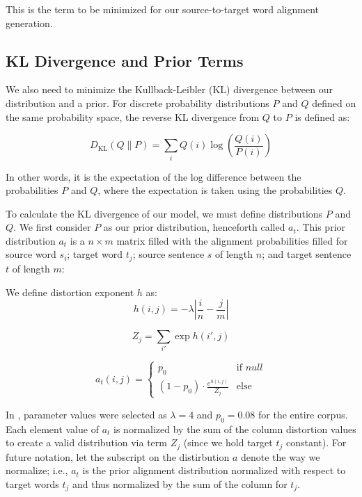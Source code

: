 \documentclass[twoside,twocolumn]{article}
\newlength\mystoreparindent
\newenvironment{myparindent}[1]{%
  \setlength{\mystoreparindent}{\the\parindent}
  \setlength{\parindent}{#1}
  }{%
  \setlength{\parindent}{\mystoreparindent}
}
\begin{document}
\begin{myparindent}{0pt}
This is the term to be minimized for our source-to-target word alignment
generation.


\subsection{KL Divergence and Prior Terms}

We also need to minimize the Kullback-Leibler (KL) divergence between our
distribution and a prior. For discrete probability distributions $P$ and $Q$
defined on the same probability space, the reverse KL divergence from $Q$ to
$P$ is defined as:

\begin{equation}
D_{\mathrm{KL}}(Q \| P) = \sum_{i} Q(i) \log \left( \frac{Q(i)}{P(i)} \right)
\end{equation}

In other words, it is the expectation of the log difference between the
probabilities $P$ and $Q$, where the expectation is taken using the
probabilities $Q$.

To calculate the KL divergence of our model, we must define
distributions $P$ and $Q$. We first consider $P$ as our prior
distribution, henceforth called $a_t$. This prior distribution $a_t$ is a
$n \times m$ matrix filled with the alignment probabilities filled for source
word $s_i$; target word $t_j$; source sentence $s$ of length $n$; and target
sentence $t$ of length $m$:

We define distortion exponent $h$ as:
\begin{equation}
  h(i, j) = {-\lambda \left| \frac{i}{n} - \frac{j}{m}\right|}
\end{equation}

\begin{equation}
  Z_j = \sum_{i'} \exp h(i', j)
\end{equation}

\begin{equation}
a_t (i, j) =
\begin{cases}
      p_0 & \text{if } null \\
     (1-p_0) \cdot \frac{e^{h(i,j)}}{Z_j} & \text{else}
   \end{cases}
\end{equation}

In \cite{dyer2013simple}, parameter values were selected as
$\lambda = 4$ and $p_0 = 0.08$ for the entire corpus.
Each element value of $a_t$ is normalized by the sum of the column distortion
values to create a valid distribution via term $Z_j$ (since we hold target $t_j$ constant). For future notation, let the subscript on the distirbution $a$ denote
the way we normalize; i.e., $a_t$ is the prior alignment distribution normalized
with respect to target words $t_j$ and thus normalized by the sum of the column
for $t_j$.


\end{myparindent}
\end{document}
